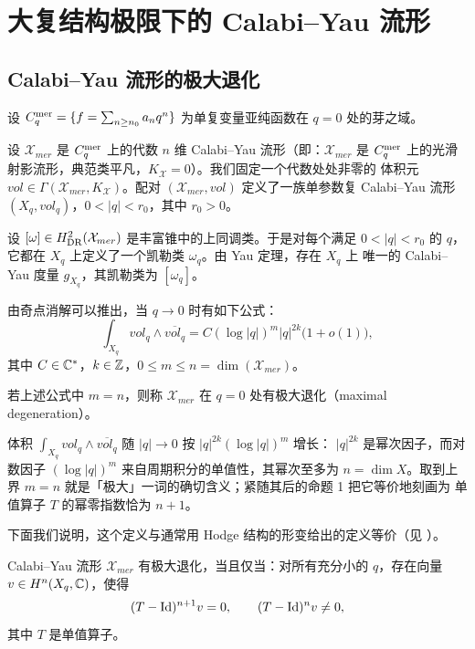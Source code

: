\section{大复结构极限下的 Calabi--Yau 流形}

\subsection{Calabi--Yau 流形的极大退化}

设 $C^{\mathrm{mer}}_{q}=\{f=\sum_{n\ge n_0}a_nq^n\}$ 为单复变量亚纯函数在 $q=0$ 处的芽之域。

设 $\mathcal{X}_{mer}$ 是 $C^{\mathrm{mer}}_{q}$ 上的代数 $n$ 维 Calabi--Yau 流形（即：$\mathcal{X}_{mer}$
是 $C^{\mathrm{mer}}_{q}$ 上的光滑射影流形，典范类平凡，$K_{\mathcal{X}}=0$）。我们固定一个代数处处非零的
体积元 $vol\in\Gamma(\mathcal{X}_{mer},K_{\mathcal{X}})$。配对 $(\mathcal{X}_{mer},vol)$
定义了一族单参数复 Calabi--Yau 流形 $(X_q,vol_q)$，$0<|q|<r_0$，其中 $r_0>0$。

设 $[\omega]\in H^2_{\mathrm{DR}}(\mathcal{X}_{mer})$ 是丰富锥中的上同调类。于是对每个满足
$0<|q|<r_0$ 的 $q$，它都在 $X_q$ 上定义了一个凯勒类 $\omega_q$。由 Yau 定理，存在 $X_q$ 上
唯一的 Calabi--Yau 度量 $g_{X_q}$，其凯勒类为 $[\omega_q]$。

由奇点消解可以推出，当 $q\to0$ 时有如下公式：
\[
  \int_{X_q}vol_q\wedge\overline{vol_q}
  =C(\log|q|)^m|q|^{2k}\bigl(1+o(1)\bigr),
\]
其中 $C\in\mathbb{C}^*$，$k\in\mathbb{Z}$，$0\le m\le n=\dim(\mathcal{X}_{mer})$。

\begin{dfn}
若上述公式中 $m=n$，则称 $\mathcal{X}_{mer}$ 在 $q=0$ 处有极大退化（maximal degeneration）。
\end{dfn}

\begin{yizhu}[极大退化的含义]
体积 $\int_{X_q}vol_q\wedge\overline{vol_q}$ 随 $|q|\to0$ 按 $|q|^{2k}(\log|q|)^m$ 增长：
$|q|^{2k}$ 是幂次因子，而对数因子 $(\log|q|)^m$ 来自周期积分的单值性，其幂次至多为
$n=\dim X$。取到上界 $m=n$ 就是「极大」一词的确切含义；紧随其后的命题 1 把它等价地刻画为
单值算子 $T$ 的幂零指数恰为 $n+1$。
\end{yizhu}

下面我们说明，这个定义与通常用 Hodge 结构的形变给出的定义等价（见 \cite{Mo}）。

\begin{prp}
Calabi--Yau 流形 $\mathcal{X}_{mer}$ 有极大退化，当且仅当：对所有充分小的 $q$，存在向量
$v\in H^n(X_q,\mathbb{C})$，使得
\[
  (T-\mathrm{Id})^{n+1}v=0,\qquad (T-\mathrm{Id})^{n}v\ne0,
\]
其中 $T$ 是单值算子。
\end{prp}


